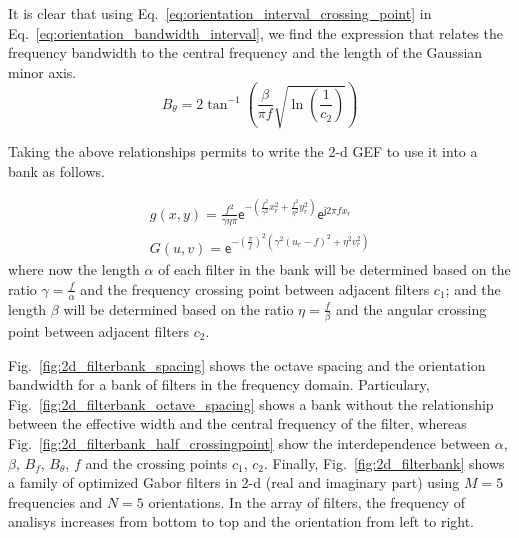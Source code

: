 It is clear that using Eq.\ \eqref{eq:orientation_interval_crossing_point} in Eq.\ \eqref{eq:orientation_bandwidth_interval}, we find the expression that relates the frequency bandwidth to the central frequency and the length of the Gaussian minor axis.
\begin{equation}\label{eq:orientation_bandwidth}
    B_{\theta} = 2 \tan^{-1} \left( \frac{\beta}{\pi f} \sqrt{\ln \left(\frac{1}{c_2}\right)} \right)
\end{equation}

Taking the above relationships permits to write the 2-d GEF to use it into a bank as follows. 

\begin{equation}\label{eq:gabor_function_2d_spacefreq_bank}
    \begin{gathered}
         g(x,y) =  \frac{f^2}{\gamma \eta \pi} \mathsf{e}^{-\left(\frac{f^2}{\gamma^2} x_r^2 + \frac{f^2}{\eta^2} y_r^2\right)} \mathsf{e}^{\mathsf{j} 2 \pi f x_r } \\
         G(u,v) =  \mathsf{e}^{-\left(\frac{\pi}{f}\right)^2\left( \gamma^2 (u_r-f)^2 + \eta^2 v_r^2\right)}
     \end{gathered}
\end{equation}
where now the length $\alpha$ of each filter in the bank will be determined based on the ratio $\gamma = \frac{f}{\alpha}$ and the frequency crossing point between adjacent filters $c_1$; and the length $\beta$ will be determined based on the ratio $\eta = \frac{f}{\beta}$ and the angular crossing point between adjacent filters $c_2$.

Fig.\ \ref{fig:2d_filterbank_spacing} shows the octave spacing and the orientation bandwidth for a bank of filters in the frequency domain. Particulary, Fig.\ \ref{fig:2d_filterbank_octave_spacing} shows a bank without the relationship between the effective width and the central frequency of the filter, whereas Fig.\ \ref{fig:2d_filterbank_half_crossingpoint} show the interdependence between $\alpha$, $\beta$, $B_f$, $B_{\theta}$, $f$ and the crossing points $c_1$, $c_2$. Finally, Fig.\ \ref{fig:2d_filterbank} shows a family of optimized Gabor filters in 2-d (real and imaginary part) using $M=5$ frequencies and $N=5$ orientations. In the array of filters, the frequency of analisys increases from bottom to top and the orientation from left to right.


